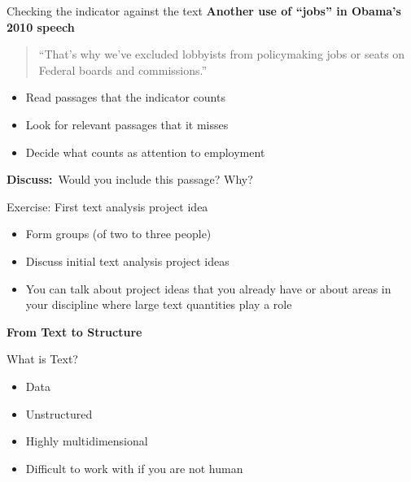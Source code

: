 \documentclass[11pt,aspectratio=43]{beamer}
\newcommand{\prompt}[1]{\vspace{0.5em}\par\textcolor{blue!55!black}{\textbf{Discuss:}}~#1\par}
\begin{document}
\begin{frame}{Checking the indicator against the text}
\textbf{Another use of ``jobs'' in Obama's 2010 speech}
\begin{quote}
``That's why we've excluded lobbyists from policymaking jobs or seats on Federal boards and commissions.''
\end{quote}
\vspace{5mm}
\begin{itemize}
\item Read passages that the indicator counts
\item Look for relevant passages that it misses
\item Decide what counts as attention to employment
\end{itemize}
\prompt{Would you include this passage? Why?}
\end{frame}


\begin{frame}{Exercise: First text analysis project idea}
\begin{itemize}
\item Form groups (of two to three people)
\item Discuss initial text analysis project ideas
\vspace{1em}
\item[$\rightarrow$] You can talk about project ideas that you already have or about areas in your discipline where large text quantities play a role  
\end{itemize}
\end{frame}


\begin{frame}[plain]
  \centering
  \vfill
  {\LARGE\bfseries
   From Text to Structure\par}
  \vfill
\end{frame}

\begin{frame}{What is Text?}
\begin{itemize}
\item Data
\item Unstructured
\item Highly multidimensional
\item Difficult to work with if you are not human
\end{itemize}
\end{frame}
\end{document}
